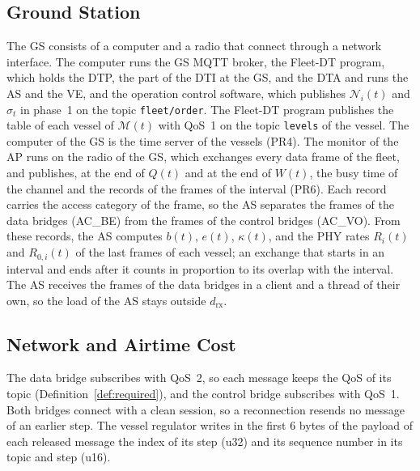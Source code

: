 \subsection{Ground Station}\label{subsec:plat_gs}
The GS consists of a computer and a radio that connect through a network interface. The computer runs the GS MQTT broker, the Fleet-DT program, which holds the DTP, the part of the DTI at the GS, and the DTA and runs the AS and the VE, and the operation control software, which publishes $\mathcal{N}_i(t)$ and $\sigma_t$ in phase~1 on the topic \texttt{fleet/order}. The Fleet-DT program publishes the table of each vessel of $\mathcal{M}(t)$ with QoS~1 on the topic \texttt{levels} of the vessel. The computer of the GS is the time server of the vessels (PR4). The monitor of the AP runs on the radio of the GS, which exchanges every data frame of the fleet, and publishes, at the end of $Q(t)$ and at the end of $W(t)$, the busy time of the channel and the records of the frames of the interval (PR6). Each record carries the access category of the frame, so the AS separates the frames of the data bridges (AC\_BE) from the frames of the control bridges (AC\_VO). From these records, the AS computes $b(t)$, $e(t)$, $\kappa(t)$, and the PHY rates $R_i(t)$ and $R_{0,i}(t)$ of the last frames of each vessel; an exchange that starts in an interval and ends after it counts in proportion to its overlap with the interval. The AS receives the frames of the data bridges in a client and a thread of their own, so the load of the AS stays outside $d_{\mathrm{rx}}$.

\subsection{Network and Airtime Cost}\label{subsec:costplat}
The data bridge subscribes with QoS~2, so each message keeps the QoS of its topic (Definition~\ref{def:required}), and the control bridge subscribes with QoS~1. Both bridges connect with a clean session, so a reconnection resends no message of an earlier step. The vessel regulator writes in the first 6 bytes of the payload of each released message the index of its step (u32) and its sequence number in its topic and step (u16).

